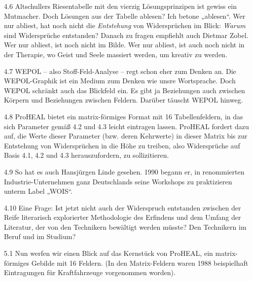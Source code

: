 \documentclass[12pt,a4paper]{article}
\begin{document}
4.6 Altschullers Riesentabelle mit den vierzig Lösungsprinzipen ist gewiss ein
Mutmacher. Doch Lösungen aus der Tabelle ablesen? Ich betone „ablesen“. Wer
nur abliest, hat noch nicht die \emph{Entstehung} von Widersprüchen im Blick:
\emph{Warum} sind Widersprüche entstanden? Danach zu fragen empfiehlt auch
Dietmar Zobel. Wer nur abliest, ist noch nicht im Bilde. Wer nur abliest, ist
auch noch nicht in der Therapie, wo Geist und Seele massiert werden, um
kreativ zu werden.

4.7 WEPOL – also Stoff-Feld-Analyse – regt schon eher zum Denken an. Die
WEPOL-Graphik ist ein Medium zum Denken wie unsre Wortsprache. Doch WEPOL
schränkt auch das Blickfeld ein. Es gibt ja Beziehungen auch zwischen Körpern
und Beziehungen zwischen Feldern. Darüber täuscht WEPOL hinweg.

4.8 ProHEAL bietet ein matrix-förmiges Format mit 16 Tabellenfeldern, in das
sich Parameter gemäß 4.2 und 4.3 leicht eintragen lassen. ProHEAL fordert dazu
auf, die Werte dieser Parameter (bzw. deren Kehrwerte) in dieser Matrix bis
zur Entstehung von Widersprüchen in die Höhe zu treiben, also Widersprüche
auf Basis 4.1, 4.2 und 4.3 herauszufordern, zu sollizitieren.

4.9 So hat es auch Hansjürgen Linde gesehen. 1990 begann er, in renommierten
Industrie-Unternehmen ganz Deutschlands seine Workshops zu praktizieren unterm
Label „WOIS“.

4.10 Eine Frage: Ist jetzt nicht auch der Widerspruch entstanden zwischen der
Reife literarisch explorierter Methodologie des Erfindens und dem Umfang der
Literatur, der von den Technikern bewältigt werden müsste? Den Technikern im
Beruf und im Studium?

5.1 Nun werfen wir einen Blick auf das Kernstück von ProHEAL, ein
matrix-förmiges Gebilde mit 16 Feldern. (In den Matrix-Feldern waren 1988
beispielhaft Eintragungen für Kraftfahrzeuge vorgenommen worden).
\end{document}
